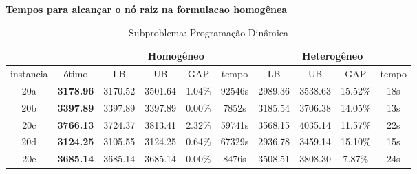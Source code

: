 \documentclass[12pt]{article}
\begin{document}
\begin{center}
\begin{large}
  \textbf{Tempos para alcan\c{c}ar o n\'o raiz na formulacao homog\^enea}
\end{large}
\end{center}

\vspace{1cm}

\begin{table}[!htb]
\centering
\footnotesize
\begin{tabular}{|c|c|c|c|c|c||c|c|c|c|}
\cline{3-10}
\multicolumn{2}{c}{} & \multicolumn{4}{|c||}{Homog\^eneo} & \multicolumn{4}{c|}{Heterog\^eneo} \\
\hline
instancia & \'otimo & LB & UB & GAP & tempo & LB & UB & GAP & tempo \\
\hline
20a & \textbf{3178.96} & 3170.52 & 3501.64 & 1.04\% & 92546s & 2989.36 & 3538.63 & 15.52\% & 18s \\
20b & \textbf{3397.89} & 3397.89 & 3397.89 & 0.00\% & 7852s & 3185.54 & 3706.38 & 14.05\% & 13s\\
20c & \textbf{3766.13} & 3724.37 & 3813.41 & 2.32\% & 59741s & 3568.15 & 4035.14 & 11.57\% & 22s\\
20d & \textbf{3124.25} & 3105.55 & 3124.25 & 0.64\% & 67329s & 2936.78 & 3459.14 & 15.10\% & 15s\\
20e & \textbf{3685.14} & 3685.14 & 3685.14 & 0.00\% & 8476s & 3508.51 & 3808.30 & 7.87\% & 24s\\
\hline
\end{tabular}
\caption{Subproblema: Programa\c{c}\~ao Din\^amica}
\end{table}
\end{document}
